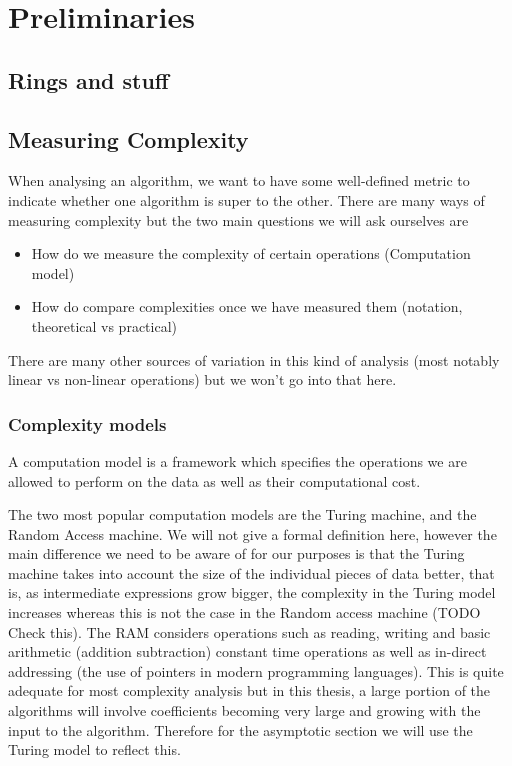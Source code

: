 \chapter{Preliminaries}\label{preliminaries}

\section{Rings and stuff}
\label{sec:prelim-rings}

\section{Measuring Complexity}%
\label{sec:Measuring Complexity}


When analysing an algorithm, we want to have some well-defined metric to indicate whether one algorithm is super to the other. There are many ways of measuring complexity but the two main questions we will ask ourselves are

\begin{itemize}
    \item How do we measure the complexity of certain operations (Computation model)
    \item How do compare complexities once we have measured them (notation, theoretical vs practical)
\end{itemize}

There are many other sources of variation in this kind of analysis (most notably linear vs non-linear operations) but we won't go into that here.

\subsection{Complexity models}%
\label{sub:Complexity models}

A computation model is a framework which specifies the operations we are allowed to perform on the data as well as their computational cost. 

The two most popular computation models are the Turing machine, and the Random Access machine. We will not give a formal definition here, however the main difference we need to be aware of for our purposes is that the Turing machine takes into account the size of the individual pieces of data better, that is, as intermediate expressions grow bigger, the complexity in the Turing model increases whereas this is not the case in the Random access machine (TODO Check this). The RAM considers operations such as reading, writing and basic arithmetic (addition subtraction) constant time operations as well as in-direct addressing (the use of pointers in modern programming languages). This is quite adequate for most complexity analysis but in this thesis, a large portion of the algorithms will involve coefficients becoming very large and growing with the input to the algorithm. Therefore for the asymptotic section we will use the Turing model to reflect this.


